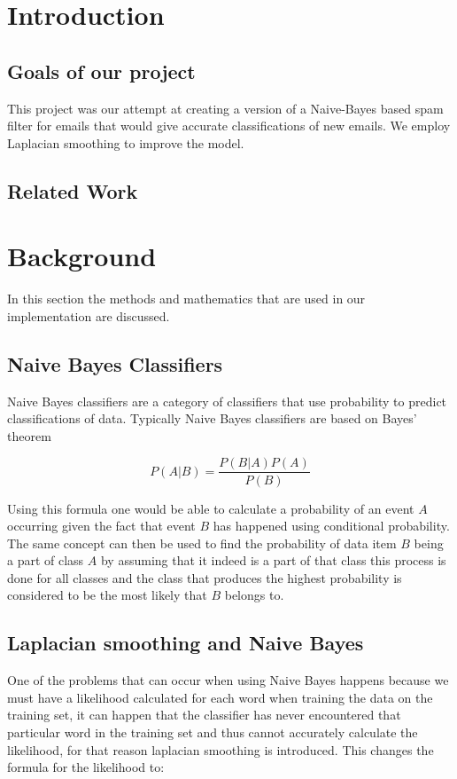 \section{Introduction}

\subsection{Goals of our project}
This project was our attempt at creating a version of a Naive-Bayes based spam filter for emails that would give accurate classifications of new emails. We employ Laplacian smoothing to improve the model. 





\subsection{Related Work}

\section{Background}
In this section the methods and mathematics that are used in our implementation are discussed.
\subsection{Naive Bayes Classifiers}
Naive Bayes classifiers are a category of classifiers that use probability to predict classifications of data. Typically Naive Bayes classifiers are based on Bayes' theorem



\[P(A|B) = \frac{P(B|A)P(A)}{P(B)}\]
 
Using this formula one would be able to calculate a probability of an event \(A\) occurring given the fact that event \(B\) has happened using conditional probability.
The same concept can then be used to find the probability of data item \(B\) being a part of class \(A\) by assuming that it indeed is a part of that class this process is done for all classes and the class that produces the highest probability is considered to be the most likely that \(B\) belongs to.


\subsection{Laplacian smoothing and Naive Bayes}
One of the problems that can occur when using Naive Bayes happens because we must have a likelihood calculated for each word when training the data on the training set, it can happen that the classifier has never encountered that particular word in the training set and thus cannot accurately calculate the likelihood, for that reason laplacian smoothing is introduced. This changes the formula for the likelihood to:



